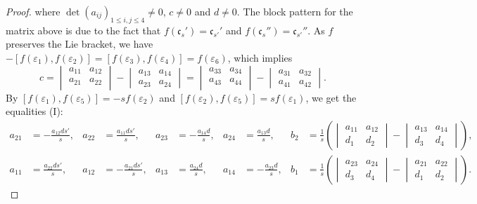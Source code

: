 \documentclass[10pt,a4paper]{amsart}
\begin{document}
\begin{proof}
where $\det(a_{ij})_{1\leq i,j \leq 4} \neq 0$, $c \neq 0$ and $d \neq 0$. The block pattern for the matrix above is due to the fact that  $f({\mathfrak c}_s') = {\mathfrak c}_{s'}'$ and $f({\mathfrak c}_s'') = {\mathfrak c}_{s'}''$. As $f$ preserves the Lie bracket, we have
$-[f(\varepsilon_1),f(\varepsilon_2)]=[f(\varepsilon_3),f(\varepsilon_4)]=f(\varepsilon_6)$, which implies
\begin{equation}\label{bck_12346}
c= \begin{vmatrix} a_{11} & a_{12} \\ a_{21} & a_{22} \\ \end{vmatrix} - \begin{vmatrix} a_{13} & a_{14} \\ a_{23} & a_{24} \end{vmatrix}
=\begin{vmatrix} a_{33} & a_{34} \\ a_{43} & a_{44} \\ \end{vmatrix} - \begin{vmatrix} a_{31} & a_{32} \\ a_{41} & a_{42} \end{vmatrix}.
\end{equation}
By $[f(\varepsilon_1),f(\varepsilon_5)]=-s f(\varepsilon_2)$ and $[f(\varepsilon_2),f(\varepsilon_5)]=sf(\varepsilon_1)$, we get the equalities (I):
\begin{align*}
a_{21}&=-\frac{a_{12}ds'}{s},& a_{22}&=\frac{a_{11}ds'}{s},& a_{23}&=-\frac{a_{14}d}{s}, & a_{24}&=\frac{a_{13}d}{s},
& b_2&=\frac{1}{s}\left(\begin{vmatrix}a_{11} & a_{12} \\ d_1 & d_2 \end{vmatrix}-\begin{vmatrix}a_{13} & a_{14} \\ d_3 & d_4 \end{vmatrix}\right),\\
a_{11}&=\frac{a_{22}ds'}{s},& a_{12}&=-\frac{a_{21}ds'}{s}, & a_{13}&=\frac{a_{24}d}{s},& a_{14}&=-\frac{a_{23}d}{s},
& b_1&=\frac{1}{s}\left(\begin{vmatrix}a_{23} & a_{24} \\ d_3 & d_4 \end{vmatrix}-\begin{vmatrix}a_{21} & a_{22} \\ d_1 & d_2 \end{vmatrix}\right).

\end{align*}
\end{proof}
\end{document}

